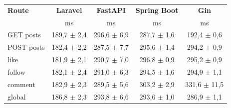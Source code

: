 \begin{tabular}{@{}lcccc@{}}
\toprule
\textbf{Route} & \textbf{Laravel} & \textbf{FastAPI} & \textbf{Spring Boot} & \textbf{Gin} \\
 & ms & ms & ms & ms \\
\midrule
GET posts & 189,7 $\pm$ 2,4 & 296,6 $\pm$ 6,9 & 287,7 $\pm$ 1,6 & 192,4 $\pm$ 0,6 \\
POST posts & 182,4 $\pm$ 2,2 & 287,5 $\pm$ 7,7 & 295,6 $\pm$ 1,4 & 294,2 $\pm$ 0,9 \\
like & 181,9 $\pm$ 2,1 & 290,7 $\pm$ 7,0 & 296,8 $\pm$ 0,9 & 295,2 $\pm$ 0,9 \\
follow & 182,1 $\pm$ 2,4 & 291,0 $\pm$ 6,3 & 294,5 $\pm$ 1,6 & 294,9 $\pm$ 1,1 \\
comment & 182,9 $\pm$ 2,3 & 289,5 $\pm$ 5,6 & 303,2 $\pm$ 2,9 & 331,6 $\pm$ 11,5 \\
global & 186,8 $\pm$ 2,3 & 293,8 $\pm$ 6,6 & 293,6 $\pm$ 1,0 & 286,9 $\pm$ 1,1 \\
\bottomrule
\end{tabular}
